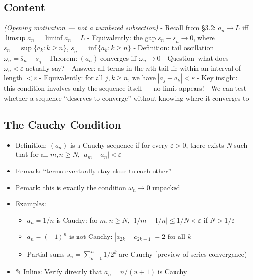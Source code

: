 \documentclass[
  10pt,
  letterpaper,
]{scrbook}
\providecommand{\tightlist}{%
  \setlength{\itemsep}{0pt}\setlength{\parskip}{0pt}}
\begin{document}
\subsection{Content}\label{content-13}

\emph{(Opening motivation --- not a numbered subsection)} - Recall from
§3.2: \(a_n \to L\) iff \(\limsup a_n = \liminf a_n = L\) -
Equivalently: the gap \(\overline{s}_n - \underline{s}_n \to 0\), where
\(\overline{s}_n = \sup\{a_k : k \geq n\}\),
\(\underline{s}_n = \inf\{a_k : k \geq n\}\) - Definition: tail
oscillation \(\omega_n = \overline{s}_n - \underline{s}_n\) - Theorem:
\((a_n)\) converges iff \(\omega_n \to 0\) - Question: what does
\(\omega_n < \varepsilon\) actually say? - Answer: all terms in the
\(n\)th tail lie within an interval of length \(< \varepsilon\) -
Equivalently: for all \(j, k \geq n\), we have
\(|a_j - a_k| < \varepsilon\) - Key insight: this condition involves
only the sequence itself --- no limit appears! - We can test whether a
sequence ``deserves to converge'' without knowing where it converges to

\subsection{The Cauchy Condition}\label{the-cauchy-condition}

\begin{itemize}
\tightlist
\item
  Definition: \((a_n)\) is a Cauchy sequence if for every
  \(\varepsilon > 0\), there exists \(N\) such that for all
  \(m, n \geq N\), \(|a_m - a_n| < \varepsilon\)
\item
  Remark: ``terms eventually stay close to each other''
\item
  Remark: this is exactly the condition \(\omega_n \to 0\) unpacked
\item
  Examples:

  \begin{itemize}
  \tightlist
  \item
    \(a_n = 1/n\) is Cauchy: for \(m, n \geq N\),
    \(|1/m - 1/n| \leq 1/N < \varepsilon\) if \(N > 1/\varepsilon\)
  \item
    \(a_n = (-1)^n\) is not Cauchy: \(|a_{2k} - a_{2k+1}| = 2\) for all
    \(k\)
  \item
    Partial sums \(s_n = \sum_{k=1}^n 1/2^k\) are Cauchy (preview of
    series convergence)
  \end{itemize}
\item
  ✎ Inline: Verify directly that \(a_n = n/(n+1)\) is Cauchy
\end{itemize}
\end{document}
